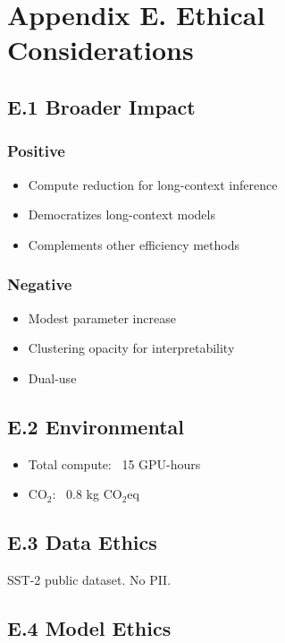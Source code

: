 \section{Appendix E. Ethical Considerations}

\subsection{E.1 Broader Impact}

\subsubsection{Positive}
\begin{itemize}
\item Compute reduction for long-context inference
\item Democratizes long-context models
\item Complements other efficiency methods

\end{itemize}
\subsubsection{Negative}
\begin{itemize}
\item Modest parameter increase
\item Clustering opacity for interpretability
\item Dual-use

\end{itemize}
\subsection{E.2 Environmental}

\begin{itemize}
\item Total compute: ~15 GPU-hours
\item CO$_2$: ~0.8 kg CO$_2$eq

\end{itemize}
\subsection{E.3 Data Ethics}

SST-2 public dataset. No PII.

\subsection{E.4 Model Ethics}

